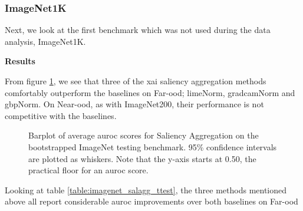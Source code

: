 \documentclass[UKenglish]{uiomasterthesis} %
\theoremstyle{definition}
\begin{document}
\subsubsection{ImageNet1K}

Next, we look at the first benchmark which was not used during the data analysis, ImageNet1K. 

\noindent \textbf{Results}

\noindent From figure \ref{fig:imagenet_salagg_bootstrap_barplot}, we see that three of the \ac{xai} saliency aggregation methods comfortably outperform the baselines on Far-\ac{ood}; \ac{lime}Norm, \ac{gradcam}Norm and \ac{gbp}Norm. On Near-\ac{ood}, as with ImageNet200, their performance is not competitive with the baselines.

\begin{figure}[H]
    \begin{center}
        
    \end{center}
    \caption[ImageNet1K Saliency Aggregation Bootstrap]{Barplot of average \ac{auroc} scores for Saliency Aggregation on the bootstrapped ImageNet testing benchmark. 95\% confidence intervals are plotted as whiskers. Note that the y-axis starts at 0.50, the practical floor for an \ac{auroc} score.}
    \label{fig:imagenet_salagg_bootstrap_barplot}
\end{figure}

Looking at table \ref{table:imagenet_salagg_ttest}, the three methods mentioned above all report considerable \ac{auroc} improvements over both baselines on Far-\ac{ood}
\end{document}
